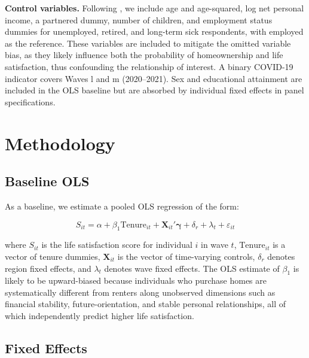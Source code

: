 \documentclass[12pt,a4paper]{article}
\begin{document}
\textbf{Control variables.} Following \citet{Will2024}, we include age and
age-squared, log net personal income, a partnered dummy, number of children,
and employment status dummies for unemployed, retired, and long-term sick
respondents, with employed as the reference. These variables are included to mitigate the omitted variable bias, as they likely influence both the probability of homeownership and life satisfaction, thus confounding the relationship of interest. A binary COVID-19 indicator
covers Waves l and m (2020--2021). Sex and educational attainment are
included in the OLS baseline but are absorbed by individual fixed effects in panel specifications.
 
 
\section{Methodology}
 
\subsection{Baseline OLS}
 
As a baseline, we estimate a pooled OLS regression of the form:
 
\begin{equation}
    S_{it} = \alpha + \beta_{1} \text{Tenure}_{it} + \mathbf{X}_{it}'\boldsymbol{\gamma}
    + \delta_{r} + \lambda_{t} + \varepsilon_{it}
\end{equation}
 
where $S_{it}$ is the life satisfaction score for individual $i$ in wave $t$,
$\text{Tenure}_{it}$ is a vector of tenure dummies, $\mathbf{X}_{it}$ is the vector of time-varying controls, $\delta_{r}$ denotes region fixed effects, and $\lambda_{t}$
denotes wave fixed effects. The OLS estimate of $\beta_{1}$ is likely to be
upward-biased because individuals who purchase homes are systematically
different from renters along unobserved dimensions such as
financial stability, future-orientation, and stable personal
relationships, all of which independently predict higher life satisfaction.
 
\subsection{Fixed Effects}
 
\end{document}
